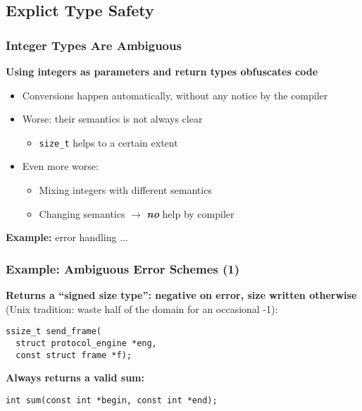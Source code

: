 \subsection{Explict Type Safety}

\begin{frame}
  \frametitle{Integer Types Are Ambiguous}

  \textbf{Using integers as parameters and return types obfuscates
    code}

  \begin{itemize}
  \item Conversions happen automatically, without any notice by the
    compiler
  \item Worse: their semantics is not always clear
    \begin{itemize}
    \item \texttt{size\_t} helps to a certain extent
    \end{itemize}
  \item Even more worse:
    \begin{itemize}
    \item Mixing integers with different semantics
    \item Changing semantics $\to$ \textbf{\textit{no}} help by
      compiler
    \end{itemize}
  \end{itemize}

  \textbf{Example:} error handling ...

\end{frame}

\begin{frame}[fragile]
  \frametitle{Example: Ambiguous Error Schemes (1)}

  \textbf{Returns a ``signed size type'': negative on error, size
    written otherwise} (Unix tradition: waste half of the domain for
  an occasional -1):

  \begin{block}{}
\begin{verbatim}
ssize_t send_frame(
  struct protocol_engine *eng,
  const struct frame *f);
\end{verbatim}
  \end{block}

  \textbf{Always returns a valid sum:}

  \begin{block}{}
\begin{verbatim}
int sum(const int *begin, const int *end);
\end{verbatim}
  \end{block}

\end{frame}

